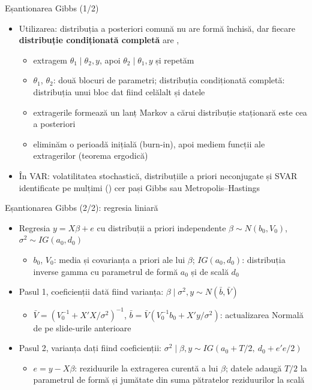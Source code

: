 \begin{frame}{Eșantionarea Gibbs (1/2)}
\itemsize{\small}
\begin{itemize}
    \item Utilizarea: distribuția a posteriori comună nu are formă închisă, dar fiecare \textbf{distribuție condiționată completă} are , 
    \begin{itemize}
        \item extragem $\theta_1\mid\theta_2, y$, apoi $\theta_2\mid\theta_1, y$ și repetăm
        \item $\theta_1$, $\theta_2$: două blocuri de parametri; distribuția condiționată completă: distribuția unui bloc dat fiind celălalt și datele
        \item extragerile formează un lanț Markov a cărui distribuție staționară este cea a posteriori
        \item eliminăm o perioadă inițială (burn-in), apoi mediem funcții ale extragerilor (teorema ergodică)
    \end{itemize}
    \item În VAR: volatilitatea stochastică, distribuțiile a priori neconjugate și SVAR identificate pe mulțimi () cer pași Gibbs sau Metropolis--Hastings
\end{itemize}
\end{frame}

\begin{frame}{Eșantionarea Gibbs (2/2): regresia liniară}
\itemsize{\small}
\begin{itemize}
    \item Regresia $y = X\beta + e$ cu distribuții a priori independente $\beta \sim N(b_0, V_0)$, $\sigma^2 \sim IG(a_0, d_0)$
    \begin{itemize}
        \item $b_0$, $V_0$: media și covarianța a priori ale lui $\beta$; $IG(a_0, d_0)$: distribuția inverse gamma cu parametrul de formă $a_0$ și de scală $d_0$
    \end{itemize}
    \item Pasul 1, coeficienții dată fiind varianța: $\beta\mid\sigma^2, y \sim N(\bar b, \bar V)$
    \begin{itemize}
        \item $\bar V = (V_0^{-1} + X'X/\sigma^2)^{-1}$, $\bar b = \bar V(V_0^{-1}b_0 + X'y/\sigma^2)$: actualizarea Normală de pe slide-urile anterioare
    \end{itemize}
    \item Pasul 2, varianța dați fiind coeficienții: $\sigma^2\mid\beta, y \sim IG(a_0 + T/2,\ d_0 + e'e/2)$
    \begin{itemize}
        \item $e = y - X\beta$: reziduurile la extragerea curentă a lui $\beta$; datele adaugă $T/2$ la parametrul de formă și jumătate din suma pătratelor reziduurilor la scală
    \end{itemize}
\end{itemize}
\end{frame}

